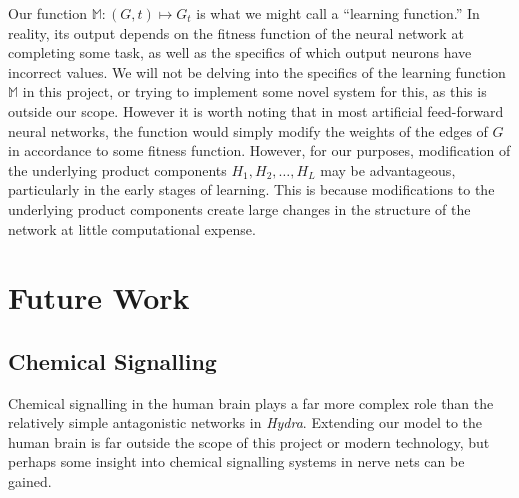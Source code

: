 \documentclass{article}
\newcommand{\listvec}[2]{#1_1, #1_2, \ldots, #1_{#2}}
\newcommand{\M}{\mathbb{M}}
\begin{document}
Our function $\M : (G, t) \mapsto G_t$ is what we might call a ``learning function.'' In reality, its output depends on the fitness function of the neural network at completing some task, as well as the specifics of which output neurons have incorrect values. We will not be delving into the specifics of the learning function $\M$ in this project, or trying to implement some novel system for this, as this is outside our scope. However it is worth noting that in most artificial feed-forward neural networks, the function would simply modify the weights of the edges of $G$ in accordance to some fitness function. However, for our purposes, modification of the underlying product components $\listvec{H}{L}$ may be advantageous, particularly in the early stages of learning. This is because modifications to the underlying product components create large changes in the structure of the network at little computational expense.





\newpage

\section{Future Work}



\subsection{Chemical Signalling}

Chemical signalling in the human brain plays a far more complex role than the relatively simple antagonistic networks in \textit{Hydra}. Extending our model to the human brain is far outside the scope of this project or modern technology, but perhaps some insight into chemical signalling systems in nerve nets can be gained.
\end{document}
